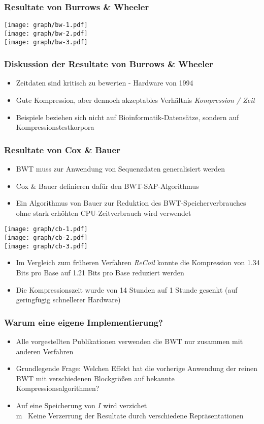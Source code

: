 \documentclass[14pt,xcolor=dvipsnames,pdftex]{beamer}
\begin{document}
\begin{frame}[allowframebreaks]
 \frametitle{Resultate von Burrows \& Wheeler}
 \texttt{[image: graph/bw-1.pdf]}
 \framebreak\\
 \texttt{[image: graph/bw-2.pdf]}
 \framebreak\\
 \texttt{[image: graph/bw-3.pdf]}
\end{frame}
\begin{frame}
 \frametitle{Diskussion der Resultate von Burrows \& Wheeler}
 \begin{itemize}
  \item Zeitdaten sind kritisch zu bewerten - Hardware von 1994
  \item Gute Kompression, aber dennoch akzeptables Verhältnis \textit{Kompression / Zeit}
  \item Beispiele beziehen sich nicht auf Bioinformatik-Datensätze, sondern auf Kompressionstestkorpora
 \end{itemize}
\end{frame}
\begin{frame}[allowframebreaks]
 \frametitle{Resultate von Cox \& Bauer}
 \begin{itemize}
  \item BWT muss zur Anwendung von Sequenzdaten generalisiert werden
  \item Cox \& Bauer definieren dafür den BWT-SAP-Algorithmus
  \item Ein Algorithmus von Bauer zur Reduktion des BWT-Speicherverbrauches ohne stark erhöhten CPU-Zeitverbrauch wird verwendet
 \end{itemize}
 \framebreak
 \texttt{[image: graph/cb-1.pdf]}
 \framebreak\\
 \texttt{[image: graph/cb-2.pdf]}
 \framebreak\\
 \texttt{[image: graph/cb-3.pdf]}
 \framebreak
 \begin{itemize}
  \item Im Vergleich zum früheren Verfahren \textit{ReCoil} konnte die Kompression von 1.34 Bits pro Base auf 1.21 Bits pro Base reduziert werden
  \item Die Kompressionszeit wurde von 14 Stunden auf 1 Stunde gesenkt (auf geringfügig schnellerer Hardware)
 \end{itemize}
\end{frame}
\begin{frame}
 \frametitle{Warum eine eigene Implementierung?}
 \begin{itemize}
  \item Alle vorgestellten Publikationen verwenden die BWT nur zusammen mit anderen Verfahren
  \item Grundlegende Frage: Welchen Effekt hat die vorherige Anwendung der reinen BWT mit verschiedenen Blockgrößen auf bekannte Kompressionsalgorithmen?
  \item Auf eine Speicherung von $I$ wird verzichet\\m
  \textrightarrow\ Keine Verzerrung der Resultate durch verschiedene Repräsentationen
 \end{itemize}
\end{frame}
\end{document}
